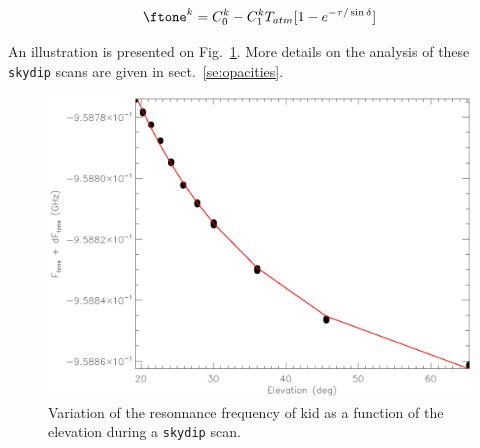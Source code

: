 \begin{equation}
\ftone^k  = C_0^k - C_1^k T_{atm}[1-e^{-\tau/\sin\delta}]
\label{eq:skydip_1}
\end{equation}

An illustration is presented on Fig.~\ref{fig:ftone_vs_elev}. More details on
the analysis of these {\tt skydip} scans are given in sect.~\ref{se:opacities}.

\begin{figure}[hhh]
\begin{center}
  \includegraphics[clip, angle=0, scale=0.75]{Figures/skydip_report.eps}
\caption[skydip]{Variation of the resonnance frequency of kid as a function of
  the elevation during a {\tt skydip} scan.}
\label{fig:ftone_vs_elev}
\end{center}
\end{figure}

\subsection{\bms}
\label{se:beammaps}

